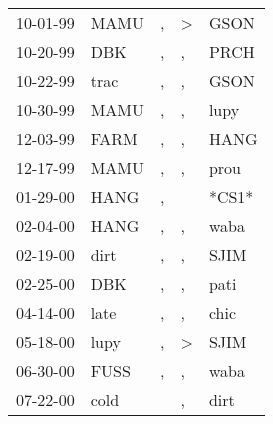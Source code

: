 \begin{supertabular}{p{0.07\textwidth}p{0.06\textwidth}p{0.02\textwidth}p{0.02\textwidth}p{0.06\textwidth}}
 10-01-99\textsuperscript{} &           MAMU\textsuperscript{} &                , &     \textgreater &          GSON\textsuperscript{} \\
 10-20-99\textsuperscript{} &            DBK\textsuperscript{} &                , &                , &          PRCH\textsuperscript{} \\
 10-22-99\textsuperscript{} &           trac\textsuperscript{} &                , &                , &          GSON\textsuperscript{} \\
 10-30-99\textsuperscript{} &           MAMU\textsuperscript{} &                , &                , &          lupy\textsuperscript{} \\
 12-03-99\textsuperscript{} &           FARM\textsuperscript{} &                , &                , &          HANG\textsuperscript{} \\
 12-17-99\textsuperscript{} &           MAMU\textsuperscript{} &                , &                , &          prou\textsuperscript{} \\
 01-29-00\textsuperscript{} &           HANG\textsuperscript{} &                , &                  &                           *CS1* \\
 02-04-00\textsuperscript{} &           HANG\textsuperscript{} &                , &                , &          waba\textsuperscript{} \\
 02-19-00\textsuperscript{} &           dirt\textsuperscript{} &                , &                , &          SJIM\textsuperscript{} \\
 02-25-00\textsuperscript{} &            DBK\textsuperscript{} &                , &                , &          pati\textsuperscript{} \\
 04-14-00\textsuperscript{} &           late\textsuperscript{} &                , &                , &          chic\textsuperscript{} \\
 05-18-00\textsuperscript{} &           lupy\textsuperscript{} &                , &     \textgreater &          SJIM\textsuperscript{} \\
 06-30-00\textsuperscript{} &           FUSS\textsuperscript{} &                , &                , &          waba\textsuperscript{} \\
 07-22-00\textsuperscript{} &           cold\textsuperscript{} &                  &                , &          dirt\textsuperscript{} \\

\end{supertabular}
